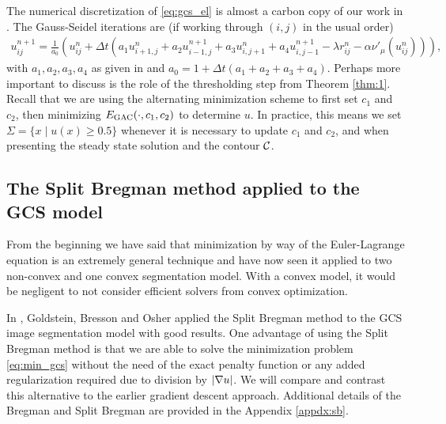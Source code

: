 The numerical discretization of \eqref{eq:gcs_el} is almost a carbon copy of our work in . The Gauss-Seidel iterations are (if working through $(i,j)$ in the usual order)
\begin{align*}
u^{n+1}_{ij} 
= \frac{1}{a_0} 
\left( u^n_{ij} + \Delta t 
\left( a_1 u^n_{i+1,j} + a_2 u^{n+1}_{i-1,j} + a_3 u^{n}_{i,j+1} + a_4 u^{n+1}_{i,j-1}
- \lambda r_{ij}^n
- \alpha \nu'_\mu( u^n_{ij} )
\right)
\right),
\end{align*}
with $a_1,a_2,a_3,a_4$ as given in  and $a_0 = 1 + \Delta t(a_1 + a_2 + a_3 + a_4)$. Perhaps more important to discuss is the role of the thresholding step from Theorem \ref{thm:1}. Recall that we are using the alternating minimization scheme to first set $c_1$ and $c_2$, then minimizing $E_\textrm{GAC}(\cdot, c_1, c_2)$ to determine $u$. In practice, this means we set $\Sigma = \{x \mid u(x) \geq 0.5\}$ whenever it is necessary to update $c_1$ and $c_2$, and when presenting the steady state solution and the contour $\mathcal{C}$.


\subsection{The Split Bregman method applied to the GCS model}
\label{subsect:sb}
From the beginning we have said that minimization by way of the Euler-Lagrange equation is an extremely general technique and have now seen it applied to two non-convex and one convex segmentation model. With a convex model, it would be negligent to not consider efficient solvers from convex optimization. 

In \cite{goldstein2010geometric}, Goldstein, Bresson and Osher applied the Split Bregman method \cite{goldstein2009split} to the GCS image segmentation model with good results. One advantage of using the Split Bregman method is that we are able to solve the minimization problem \eqref{eq:min_gcs} without the need of the exact penalty function  or any added regularization required due to division by $\lvert\nabla u\rvert$. We will compare and contrast this alternative to the earlier gradient descent approach. Additional details of the Bregman and Split Bregman are provided in the Appendix \ref{appdx:sb}.  

